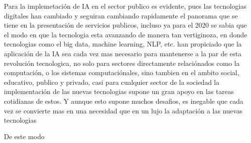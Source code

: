 Para \citet{publicservices} la implemetación de IA en el sector publico es evidente, pues las tecnologias digitales han cambiado y seguiran cambiando rapidamente el panorama que se tiene en la presentación de servicios publicos, incluso ya para el 2020 se sabia que el modo en que la tecnologia esta avanzando de manera tan vertiginoza, en donde tecnologias como el big data, machine learning, NLP, etc. han propiciado que la aplicación de la IA sea cada vez mas necesario para mantenerse a la par de esta revolución tecnologica, no solo para sectores directamente relaciónados como la computación, o los sistemas computaciónales, sino tambien en el ambito social, educativo, publico y privado, casi para cualquier sector de la sociedad la implementación de las nuevas tecnologias supone un gran apoyo en las tareas cotidianas de estos. Y aunque esto supone muchos desafios, es inegable que cada vez se convierte mas en una necesidad que en un lujo la adaptación a las nuevas tecnologias\citep{publico}

De este modo \citet{aiftps}